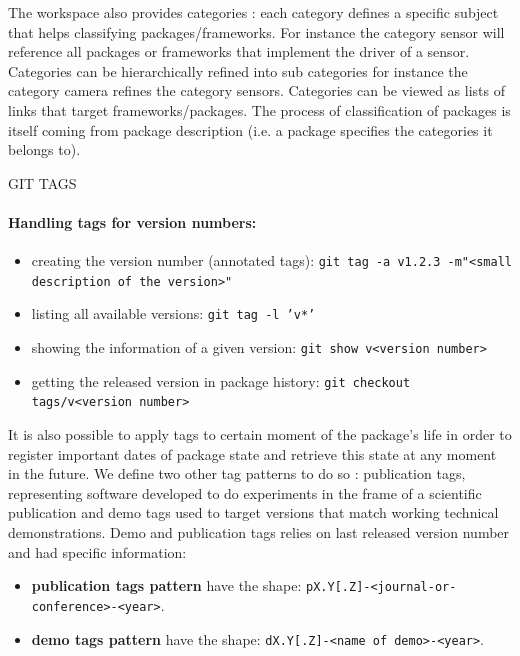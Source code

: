 \documentclass[12pt,a4paper]{article}
\begin{document}
 The workspace also provides categories : each category defines a specific subject that helps classifying packages/frameworks. For instance the category sensor will reference all packages or frameworks that implement the driver of a sensor. Categories can be hierarchically refined into sub categories for instance the category camera refines the category sensors. Categories can be viewed as lists of links that target frameworks/packages. The process of classification of packages is itself coming from package description (i.e. a package specifies the categories it belongs to).
 
 
GIT TAGS
 
\paragraph{Handling tags for version numbers:}
\begin{itemize}
\item creating the version number (annotated tags):
\linebreak \texttt{git tag -a v1.2.3 -m"<small description of the version>"}
\item listing all available versions: 
\linebreak \texttt{git tag -l 'v*'}
\item showing the information of a given version: 
\linebreak \texttt{git show v<version number>}
\item getting the released version in package history: 
\linebreak \texttt{git checkout tags/v<version number>}
\end{itemize}


It is also possible to apply tags to certain moment of the package's life in order to register important dates of package state and retrieve this state at any moment in the future. We define two other tag patterns to do so : publication tags, representing software developed to do experiments in the frame of a scientific publication and demo tags used to target versions that match working technical demonstrations. Demo and publication tags relies on last released version number and had specific information:
\begin{itemize}
\item \textbf{publication tags pattern} have the shape: \linebreak \texttt{pX.Y[.Z]-<journal-or-conference>-<year>}.
\item \textbf{demo tags pattern} have the shape:
\linebreak \texttt{dX.Y[.Z]-<name of demo>-<year>}.
\end{itemize}
 
\end{document}
